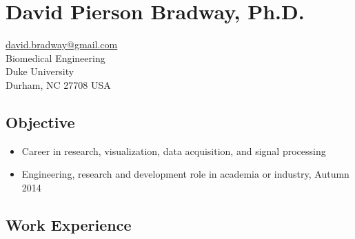 \documentclass[]{article}
\begin{document}
\section{David Pierson Bradway,
Ph.D.}\label{david-pierson-bradway-ph.d.}

\href{mailto:david.bradway@gmail.com}{david.bradway@gmail.com}\\Biomedical
Engineering\\Duke University\\Durham, NC 27708 USA

\subsection{Objective}\label{objective}

\begin{itemize}
\itemsep1pt\parskip0pt
\item
  Career in research, visualization, data acquisition, and signal
  processing
\item
  Engineering, research and development role in academia or industry,
  Autumn 2014
\end{itemize}

\subsection{Work Experience}\label{work-experience}
\end{document}
